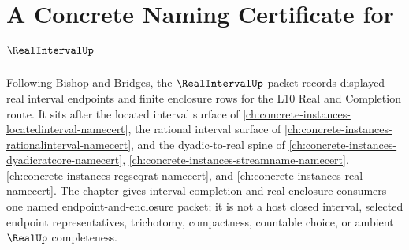 \chapter{A Concrete Naming Certificate for $\RealIntervalUp$}
\label{ch:concrete-instances-realinterval-namecert}

Following Bishop and Bridges, the $\RealIntervalUp$ packet records displayed real interval endpoints and finite enclosure rows for the L10 Real and Completion route. It sits after the located interval surface of \autoref{ch:concrete-instances-locatedinterval-namecert}, the rational interval surface of \autoref{ch:concrete-instances-rationalinterval-namecert}, and the dyadic-to-real spine of \autoref{ch:concrete-instances-dyadicratcore-namecert}, \autoref{ch:concrete-instances-streamname-namecert}, \autoref{ch:concrete-instances-regseqrat-namecert}, and \autoref{ch:concrete-instances-real-namecert}. The chapter gives interval-completion and real-enclosure consumers one named endpoint-and-enclosure packet; it is not a host closed interval, selected endpoint representatives, trichotomy, compactness, countable choice, or ambient $\RealUp$ completeness.

